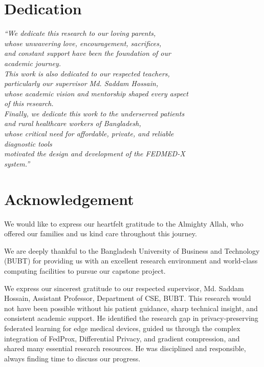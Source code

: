\documentclass[12pt,a4paper]{report}
\begin{document}
\chapter*{Dedication}
\vspace*{3cm}
\begin{center}
    \itshape
    ``We dedicate this research to our loving parents, \\
    whose unwavering love, encouragement, sacrifices, \\
    and constant support have been the foundation of our \\
    academic journey.\\[1cm]
    
    This work is also dedicated to our respected teachers, \\
    particularly our supervisor Md. Saddam Hossain, \\
    whose academic vision and mentorship shaped every aspect \\
    of this research.\\[1cm]
    
    Finally, we dedicate this work to the underserved patients \\
    and rural healthcare workers of Bangladesh, \\
    whose critical need for affordable, private, and reliable \\
    diagnostic tools \\
    motivated the design and development of the FEDMED-X \\
    system.''
\end{center}

\clearpage

\chapter*{Acknowledgement}

We would like to express our heartfelt gratitude to the Almighty Allah, who offered our families and us kind care throughout this journey.

We are deeply thankful to the Bangladesh University of Business and Technology (BUBT) for providing us with an excellent research environment and world-class computing facilities to pursue our capstone project.

We express our sincerest gratitude to our respected supervisor, Md. Saddam Hossain, Assistant Professor, Department of CSE, BUBT. This research would not have been possible without his patient guidance, sharp technical insight, and consistent academic support. He identified the research gap in privacy-preserving federated learning for edge medical devices, guided us through the complex integration of FedProx, Differential Privacy, and gradient compression, and shared many essential research resources. He was disciplined and responsible, always finding time to discuss our progress.
\end{document}
